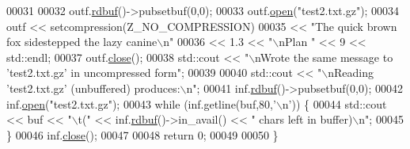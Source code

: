 \begin{DoxyCode}
00031 
00032   outf.\hyperlink{classgzofstream_a2fef74202b114357f41cfeb28f1d2acc}{rdbuf}()->pubsetbuf(0,0);
00033   outf.\hyperlink{classgzofstream_aee3eb31f07eda7f5ad1f60d59ea4b239}{open}(\textcolor{stringliteral}{"test2.txt.gz"});
00034   outf << setcompression(Z\_NO\_COMPRESSION)
00035        << \textcolor{stringliteral}{"The quick brown fox sidestepped the lazy canine\(\backslash\)n"}
00036        << 1.3 << \textcolor{stringliteral}{"\(\backslash\)nPlan "} << 9 << std::endl;
00037   outf.\hyperlink{classgzofstream_a59e8b01e1c9741085f18ca456c4b8f54}{close}();
00038   std::cout << \textcolor{stringliteral}{"\(\backslash\)nWrote the same message to 'test2.txt.gz' in uncompressed form"};
00039 
00040   std::cout << \textcolor{stringliteral}{"\(\backslash\)nReading 'test2.txt.gz' (unbuffered) produces:\(\backslash\)n"};
00041   inf.\hyperlink{classgzifstream_a1c5a0ab4f99f8d8e3406af7bfd82b133}{rdbuf}()->pubsetbuf(0,0);
00042   inf.\hyperlink{classgzifstream_a8105f9300d36dafbe8b10c204583f5a1}{open}(\textcolor{stringliteral}{"test2.txt.gz"});
00043   \textcolor{keywordflow}{while} (inf.getline(buf,80,\textcolor{charliteral}{'\(\backslash\)n'})) \{
00044     std::cout << buf << \textcolor{stringliteral}{"\(\backslash\)t("} << inf.\hyperlink{classgzifstream_a1c5a0ab4f99f8d8e3406af7bfd82b133}{rdbuf}()->in\_avail() << \textcolor{stringliteral}{" chars left in buffer)\(\backslash\)n"};
00045   \}
00046   inf.\hyperlink{classgzifstream_a073fadd9dc90195c47a6ae2d863c8ace}{close}();
00047 
00048   \textcolor{keywordflow}{return} 0;
00049 
00050 \}
\end{DoxyCode}
